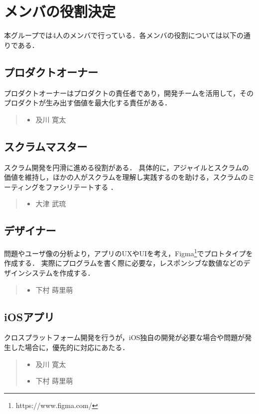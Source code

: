 \section{メンバの役割決定}
本グループでは4人のメンバで行っている．各メンバの役割については以下の通りである．

\subsection{プロダクトオーナー}
プロダクトオーナーはプロダクトの責任者であり，開発チームを活用して，そのプロダクトが生み出す価値を最大化する責任がある\cite{scrum}．
\begin{quote}
    \begin{itemize}
        \item 及川 寛太
    \end{itemize}
\end{quote}

\subsection{スクラムマスター}
スクラム開発を円滑に進める役割がある．
具体的に，アジャイルとスクラムの価値を維持し，ほかの人がスクラムを理解し実践するのを助ける，スクラムのミーティングをファシリテートする \cite{scrum_master}．
\begin{quote}
    \begin{itemize}
        \item 大津 武琉
    \end{itemize}
\end{quote}

\subsection{デザイナー}
問題やユーザ像の分析より，アプリのUXやUIを考え，Figma\footnote{https://www.figma.com/}でプロトタイプを作成する．
実際にプログラムを書く際に必要な，レスポンシブな数値などのデザインシステムを作成する．
\begin{quote}
    \begin{itemize}
        \item 下村 蒔里萌
    \end{itemize}
\end{quote}

\subsection{iOSアプリ}
クロスプラットフォーム開発を行うが，iOS独自の開発が必要な場合や問題が発生した場合に，優先的に対応にあたる．
\begin{quote}
    \begin{itemize}
        \item 及川 寛太
        \item 下村 蒔里萌
    \end{itemize}
\end{quote}

